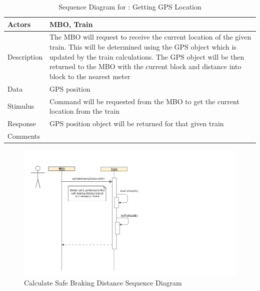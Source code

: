\documentclass[]{article}
\begin{document}
\begin{table}[H]
	\centering
	\caption{Sequence Diagram for : Getting GPS Location}
	\begin{tabular}{|l|l|}
		\hline
		Actors & \parbox[t]{10cm}{MBO, Train} \\ \hline
		Description & \parbox[t]{10cm}{The MBO will request to receive the current location of the given train. This will be determined using the GPS object which is updated by the train calculations. The GPS object will be then returned to the MBO with the current block and distance into block to the nearest meter} \\ \hline
		Data &  \parbox[t]{10cm}{GPS position} \\ \hline
		Stimulus &  \parbox[t]{10cm}{Command will be requested from the MBO to get the current location from the train} \\ \hline
		Response & \parbox[t]{10cm}{GPS position object will be returned for that given train}\\ \hline
		Comments & \parbox[t]{10cm}{ }  \\ \hline
	\end{tabular}
\end{table}

\begin{figure}[H]
	\centering
	\includegraphics[scale=.5]{train_model_sqd_get_safebraking_dist.png}
	\caption{Calculate Safe Braking Distance Sequence Diagram}
\end{figure}
\end{document}
